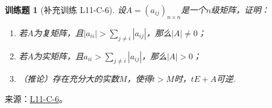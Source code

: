 \documentclass[UTF8,12pt,a4paper,fontset=fandol]{ctexart}
\newtheorem{exercise}{训练题}[section]
\begin{document}
\begin{exercise}[补充训练 L11-C-6]\label{prob:L11-C-6}
设$A=(a_{ij})_{n \times n}$是一个$n$级矩阵，证明：
        \begin{enumerate}
            \item 若$A$为复矩阵，且$|a_{ii}|>\displaystyle\sum_{j \neq i}|a_{ij}|$，那么$|A|\neq 0$；

            \item 若$A$为实矩阵，且$a_{ii}>\displaystyle\sum_{j \neq i}|a_{ij}|$，那么$|A|>0$；

            \item （推论）存在充分大的实数$M$，使得$t>M$时，$tE+A$可逆.
        \end{enumerate}
\end{exercise}
\noindent 来源：\href{https://github.com/yhwu-is/Linear-Algebra-Left-Undone/blob/new/%E8%AE%B2%E4%B9%89/%E4%B8%93%E9%A2%98/11%20%E6%9C%9D%E8%8A%B1%E5%A4%95%E6%8B%BE.tex}{L11-C-6}。
\end{document}
